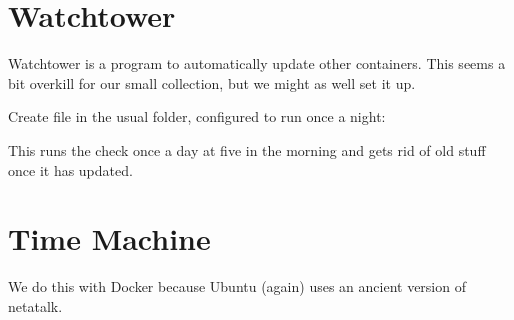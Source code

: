 \documentclass[a4paper,10pt,english]{sphinxmanual}
\begin{document}
\section{Watchtower}
\label{\detokenize{containers:watchtower}}
Watchtower is a program to automatically update other containers. This seems a
bit overkill for our small collection, but we might as well set it up.

\begin{sphinxVerbatim}[commandchars=\\\{\}]
   
\end{sphinxVerbatim}

Create  file in the usual folder, configured to run once
a night:

\begin{sphinxVerbatim}[commandchars=\\\{\}]
   \PYGZbs{}
  \PYGZbs{}
  \PYGZbs{}
   
\end{sphinxVerbatim}

This runs the check once a day at five in the morning and gets rid of old stuff
once it has updated.


\section{Time Machine}
\label{\detokenize{containers:time-machine}}
We do this with Docker because Ubuntu (again) uses an ancient version of
netatalk.

\begin{sphinxVerbatim}[commandchars=\\\{\}]
   \PYGZbs{}
   
   
   
   
   
\end{sphinxVerbatim}
\end{document}
